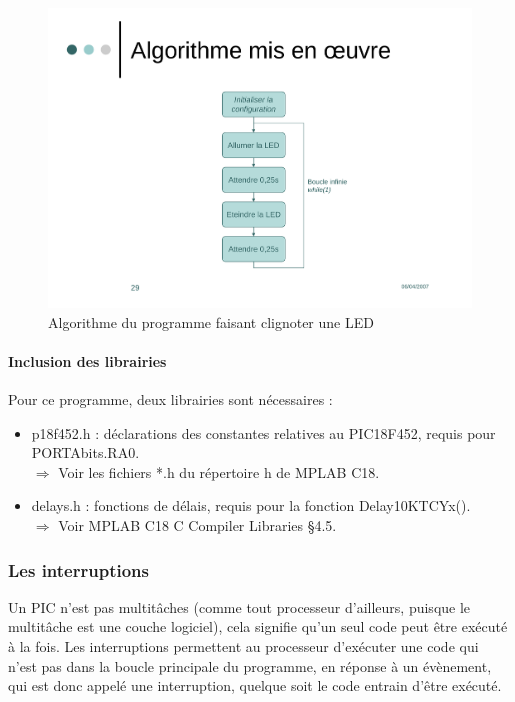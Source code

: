 \documentclass[a4paper]{article}
\begin{document}
\begin{figure}[H]
	\centering
	\includegraphics[scale=0.60]{Images/Algorithme_clignoter_LED}
	\caption{Algorithme du programme faisant clignoter une \ac{LED}
		\label{Algorithme_clignoter_LED}}
\end{figure}

\paragraph{Inclusion des librairies}

Pour ce programme, deux librairies sont nécessaires :

\begin{itemize}
	\item \og{}p18f452.h\fg{} : déclarations des constantes relatives au PIC18F452, requis pour PORTAbits.RA0.\\
	$\Rightarrow$ Voir les fichiers *.h du répertoire \og{}h\fg{} de MPLAB C18.
	\item \og{}delays.h\fg{} : fonctions de délais, requis pour la fonction Delay10KTCYx().\\
	$\Rightarrow$ Voir MPLAB C18 C Compiler Libraries §4.5.
\end{itemize}

\subsubsection{Les interruptions}

Un PIC n'est pas multitâches (comme tout processeur d'ailleurs, puisque le multitâche est une couche logiciel), cela signifie qu'un seul code peut être exécuté à la fois. Les interruptions permettent au processeur d'exécuter une code qui n'est pas dans la boucle principale du programme, en réponse à un évènement, qui est donc appelé une interruption, quelque soit le code entrain d'être exécuté.
\end{document}
